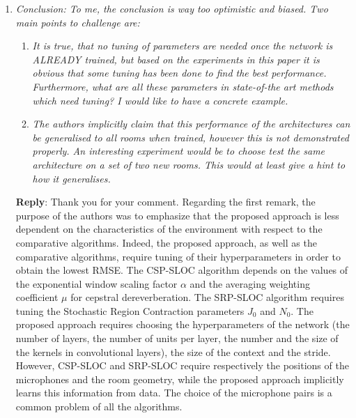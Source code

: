 \documentclass[11pt, technote, letterpaper, oneside, onecolumn]{IEEEtran}
\begin{document}
\begin{enumerate}
\item \textit{Conclusion: To me, the conclusion is way too optimistic and biased. Two main points to challenge are:}
	\begin{enumerate}
		\item  \textit{It is true, that no tuning of parameters are needed once the network is ALREADY trained, but based on the experiments in this paper it is obvious that some tuning has been done to find the best performance. Furthermore, what are all these parameters in state-of-the art methods which need tuning? I would like to have a concrete example.}
		\item  \textit{The authors implicitly claim that this performance of the architectures can be generalised to all rooms when trained, however this is not demonstrated properly. An interesting experiment would be to choose test the same architecture on a set of two new rooms. This would at least give a hint to how it generalises.}
	\end{enumerate}
 \textbf{Reply}: Thank you for your comment. Regarding the first remark, the purpose of the authors was to emphasize that the proposed approach is less dependent on the characteristics of the environment with respect to the comparative algorithms. Indeed, the proposed approach, as well as the comparative algorithms, require tuning of their hyperparameters in order to obtain the lowest RMSE. The CSP-SLOC algorithm depends on the values of the exponential window scaling factor $\alpha$ and the averaging weighting coefficient $\mu$ for cepstral dereverberation. The SRP-SLOC algorithm requires  tuning the Stochastic Region Contraction parameters $J_0$ and $N_0$. The proposed approach requires choosing the hyperparameters of the network (the number of layers, the number of units per layer, the number and the size of the kernels in convolutional layers), the size of the context and the stride.  However, CSP-SLOC and SRP-SLOC require respectively the positions of the microphones and the room geometry, while the proposed approach implicitly learns this information from data. The choice of the microphone pairs is a common problem of all the algorithms. %

\end{enumerate}
\end{document}
